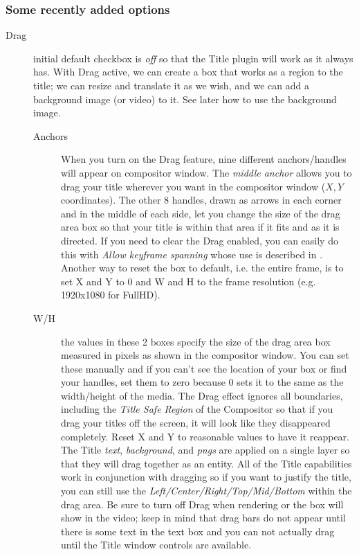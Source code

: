 \subsubsection*{Some recently added options}%
\label{ssub:some_recently_added_options}

\begin{description}
    \item[Drag] initial default checkbox is \textit{off} so that the Title plugin will work as it always has. With Drag active, we can create a box that works as a region to the title; we can resize and translate it as we wish, and we can add a background image (or video) to it. See later how to use the background image.
    \begin{description}
        \item[Anchors] When you turn on the Drag feature, nine different anchors/handles will appear on compositor window. The \textit{middle anchor} allows you to drag your title wherever you want in the compositor window ($X, Y$ coordinates). The other 8 handles, drawn as arrows in each corner and in the middle of each side, let you change the size of the drag area box so that your title is within that area if it fits and as it is directed.  If you need to clear the Drag enabled, you can easily do this with \textit{Allow keyframe spanning} whose use is described in . Another way to reset the box to default, i.e. the entire frame, is to set X and Y to 0 and W and H to the frame resolution (e.g. 1920x1080 for FullHD).
        \item[W/H] the values in these 2 boxes specify the size of the drag area box measured in pixels as shown in the compositor window. You can set these manually and if you can't see the location of your box or find your handles, set them to zero because $0$ sets it to the same as the width/height of the media.
        The Drag effect ignores all boundaries, including the \textit{Title Safe Region} of the Compositor so that if you drag your titles off the screen, it will look like they disappeared completely. Reset X and Y to reasonable values to have it reappear. The Title \textit{text}, \textit{background}, and \textit{pngs} are applied on a single layer so that they will drag together as an entity. All of the Title capabilities work in conjunction with dragging so if you want to justify the title, you can still use the \textit{Left/Center/Right/Top/Mid/Bottom} within the drag area. Be sure to turn off Drag when rendering or the box will show in the video; keep in mind that drag bars do not appear until there is some text in the text box and you can not actually drag until the Title window controls are available.
    \end{description}
    

\end{description}
